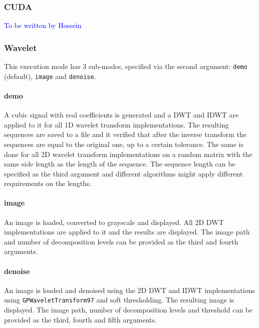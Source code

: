\subsubsection{CUDA}
\textcolor{blue}{To be written by Hossein}

\subsubsection{Wavelet}
This execution mode has 3 sub-modes, specified via the second argument: \texttt{demo} (default), \texttt{image} and \texttt{denoise}.
\paragraph{demo} A cubic signal with real coefficients is generated and a DWT and IDWT are applied to it for all 1D wavelet transform implementations. The resulting sequences are saved to a file and it verified that after the inverse transform the sequences are equal to the original one, up to a certain tolerance. The same is done for all 2D wavelet transform implementations on a random matrix with the same side length as the length of the sequence. The sequence length can be specified as the third argument and different algorithms might apply different requirements on the lengths.
\paragraph{image} An image is loaded, converted to grayscale and displayed. All 2D DWT implementations are applied to it and the results are displayed. The image path and number of decomposition levels can be provided as the third and fourth arguments.
\paragraph{denoise} An image is loaded and denoised using the 2D DWT and IDWT implementations using \texttt{GPWaveletTransform97} and soft thresholding. The resulting image is displayed. The image path, number of decomposition levels and threshold can be provided as the third, fourth and fifth arguments.


